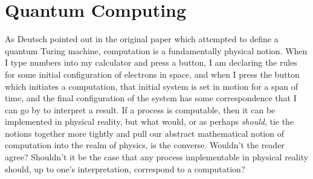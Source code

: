 \section{Quantum Computing}
As Deutsch pointed out in the original paper which attempted to define a quantum Turing machine, computation is a fundamentally physical notion. When I type numbers into my calculator and press a button, I am declaring the rules for some initial configuration of electrons in space, and when I press the button which initiates a computation, that initial system is set in motion for a span of time, and the final configuration of the system has some correspondence that I can go by to interpret a result. If a process is computable, then it can be implemented in physical reality, but what would, or as perhaps \textit{should}, tie the notions together more tightly and pull our abstract mathematical notion of computation into the realm of physics, is the converse. Wouldn't the reader agree? Shouldn't it be the case that any process implementable in physical reality should, up to one's interpretation, correspond to a computation? 
